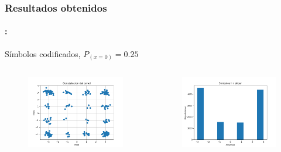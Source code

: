 \begin{frame}
  \frametitle{\textbf{Resultados obtenidos}}
   \framesubtitle{\secname : \subsecname}
   Símbolos codificados, $P_{(x=0)}=0.25$
    \vspace{-0.3cm}

\begin{columns}
    \begin{column}{0.48\linewidth}  
    \begin{figure}
        \centering
    \includegraphics[width=\textwidth]{Graficos/Channel_Constelation_3.png}%
    \end{figure}
    \end{column}

    \begin{column}{0.48\linewidth}
    \begin{figure}
        \centering
    \includegraphics[width=\textwidth]{Graficos/I_symbols_slicer_3.png}
    \end{figure}
    \end{column}
\end{columns}
\end{frame}

